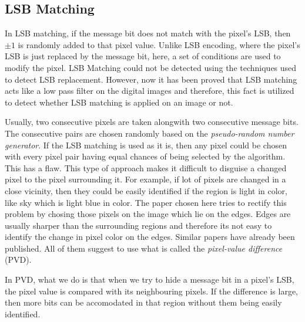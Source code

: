\documentclass{report}
\begin{document}
\subsection{LSB Matching}
In LSB matching, if the message bit does not match with the pixel's LSB, then $\pm 1$ is randomly added to that pixel value. Unlike LSB encoding, where the pixel's LSB is just replaced by the message bit, here, a set of conditions are used to modify the pixel. LSB Matching could not be detected using the techniques used to detect LSB replacement. However, now it has been proved that LSB matching acts like a low pass filter on the digital images and therefore, this fact is utilized to detect whether LSB matching is applied on an image or not. \par Usually, two consecutive pixels are taken alongwith two consecutive message bits. The consecutive pairs are chosen randomly based on the {\it pseudo-random number generator}. If the LSB matching is used as it is, then any pixel could be chosen with every pixel pair having equal chances of being selected by the algorithm. This has a flaw. This type of approach makes it difficult to disguise a changed pixel to the pixel surrounding it. For example, if lot of pixels are changed in a close vicinity, then they could be easily identified if the region is light in color, like sky which is light blue in color. The paper chosen here tries to rectify this problem by chosing those pixels on the image which lie on the edges. Edges are usually sharper than the surrounding regions and therefore its not easy to identify the change in pixel color on the edges. Similar papers have already been published. All of them suggest to use what is called the {\it pixel-value difference} (PVD). \par In PVD, what we do is that when we try to hide a message bit in a pixel's LSB, the pixel value is compared with its neighbouring pixels. If the difference is large, then more bits can be accomodated in that region without them being easily identified.
\end{document}
